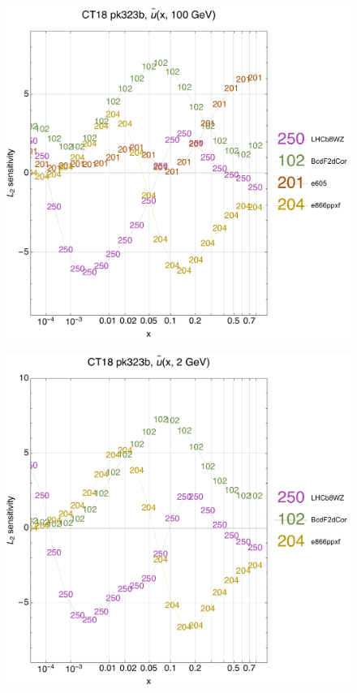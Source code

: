 \documentclass[10pt,aps,prd,floatfix,titlepage]{revtex4}
\begin{document}
\begin{figure}
\includegraphics[width=\textwidth,height=0.44\textheight,keepaspectratio]{1/ifl-1_ct18nn_L2_q100_Sf_1.pdf}
\caption{}
\end{figure}
\begin{figure}
\includegraphics[width=\textwidth,height=0.44\textheight,keepaspectratio]{1/ifl-1_ct18nn_L2_q2_Sf_1.pdf}
\caption{}
\end{figure}
\end{document}
